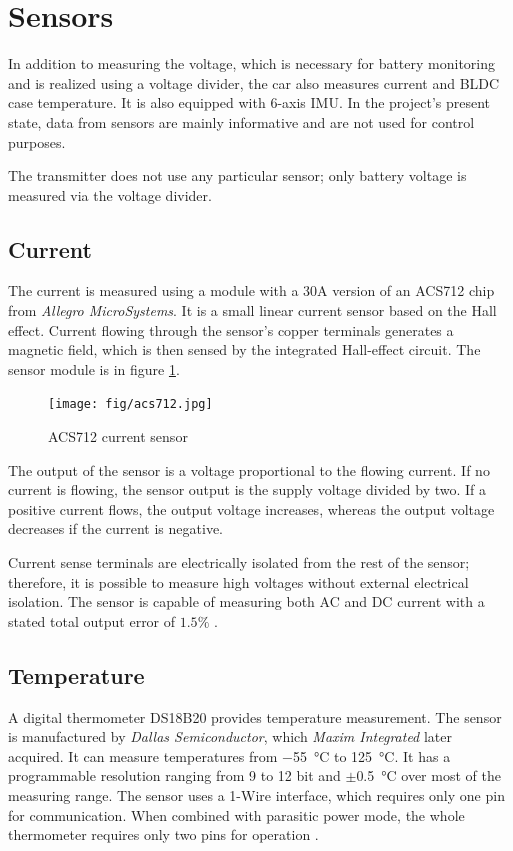 \section{Sensors}
\label{hw_sensors}
In addition to measuring the voltage, which is necessary for battery monitoring and is realized using a voltage divider, the car also measures current and BLDC case temperature. It is also equipped with 6-axis IMU. In the project's present state, data from sensors are mainly informative and are not used for control purposes.

The transmitter does not use any particular sensor; only battery voltage is measured via the voltage divider.

\subsection{Current}	
The current is measured using a module with a 30A version of an ACS712 chip from \textit{Allegro MicroSystems}. It is a small linear current sensor based on the Hall effect. Current flowing through the sensor's copper terminals generates a magnetic field, which is then sensed by the integrated Hall-effect circuit. The sensor module is in figure \ref{fig:acs712}.
\begin{figure}[h]
\centering
\texttt{[image: fig/acs712.jpg]}
\caption{ACS712 current sensor \cite{acs_pic}}
\label{fig:acs712}
\end{figure}

The output of the sensor is a voltage proportional to the flowing current. If no current is flowing, the sensor output is the supply voltage divided by two. If a positive current flows, the output voltage increases, whereas the output voltage decreases if the current is negative.

Current sense terminals are electrically isolated from the rest of the sensor; therefore, it is possible to measure high voltages without external electrical isolation. The sensor is capable of measuring both AC and DC current with a stated total output error of $1.5\%$ \cite{acs_datasheet}.

\subsection{Temperature}
A digital thermometer DS18B20 provides temperature measurement. The sensor is manufactured by \textit{Dallas Semiconductor}, which \textit{Maxim Integrated} later acquired. It can measure temperatures from \SI{-55}{\degreeCelsius} to \SI{125}{\degreeCelsius}. It has a programmable resolution ranging from 9 to 12 bit and $\pm$\SI{0.5}{\degreeCelsius} over most of the measuring range. The sensor uses a 1-Wire interface, which requires only one pin for communication. When combined with parasitic power mode, the whole thermometer requires only two pins for operation \cite{ds_datasheet}.

